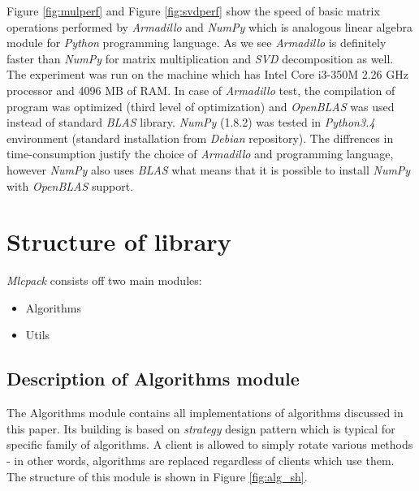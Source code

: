 Figure \ref{fig:mulperf} and Figure \ref{fig:svdperf} show the speed of basic matrix operations performed by \textit{Armadillo} and \textit{NumPy} which is analogous linear algebra module for \textit{Python} programming language. As we see \textit{Armadillo} is definitely faster than \textit{NumPy} for matrix multiplication and \textit{SVD} decomposition as well.   
The experiment was run on the machine which has Intel Core i3-350M 2.26 GHz processor and 4096 MB of RAM. In case of \textit{Armadillo} test, the compilation of program was optimized (third level of optimization) and \textit{OpenBLAS} was used instead of standard \textit{BLAS} library. \textit{NumPy} (1.8.2) was tested in \textit{Python3.4} environment (standard installation from \textit{Debian} repository). The diffrences in time-consumption justify the choice of \textit{Armadillo} and  programming language, however \textit{NumPy} also uses \textit{BLAS} what means that it is possible to install \textit{NumPy} with \textit{OpenBLAS} support.

\section{Structure of library}

\textit{Mlcpack} consists off two main modules:
\begin{itemize}
\item Algorithms
\item Utils
\end{itemize}

\subsection{Description of Algorithms module}

The Algorithms module contains all implementations of algorithms discussed in this paper. Its building is based on \textit{strategy} design pattern which is typical for specific family of algorithms. A client is allowed to simply rotate various methods - in other words, algorithms are replaced regardless of clients which use them. The structure of this module is shown in Figure \ref{fig:alg_sh}. 

